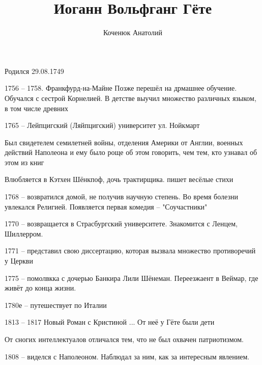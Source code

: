 \documentclass[10pt,a4paper]{article}
\author{Коченюк Анатолий}
\title{Иоганн Вольфганг Гёте}
\begin{document}
\maketitle

Родился 29.08.1749

1756 -- 1758. Франкфурд-на-Майне
Позже перешёл на дрмашнее обучение. Обучался с сестрой Корнелией. В детстве выучил множество различных языком, в том числе древних

1765 -- Лейпцигский (Ляйпцигский) университет ул. Нойкмарт

Был свидетелем семилетней войны, отделения Америки от Англии, военных действий Наполеона и ему было роще об этом говорить, чем тем, кто узнавал об этом из книг

Влюбляется в Кэтхен Шёнкпоф, дочь трактирщика. пишет весёлые стихи

1768 -- возвратился домой, не получив научную степень. Во время болезни увлекался Религией. Появляется первая комедия -- "Соучастники"

1770 -- возвращается в Страсбургский университете. Знакомится с Ленцем, Шиллерром.

1771 -- представил свою диссертацию, которая вызвала множество противоречий у Церкви

1775 -- помолвкка с дочерью Банкира Лили Шёнеман. Переезжаент в Веймар, где живёт до конца жизни.

1780е -- путешествует по Италии

1813 -- 1817 Новый Роман с Кристиной ... От неё у Гёте были дети

От сногих интеллектуалов отличался тем, что не был охвачен патриотизмом.

1808 -- виделся с Наполеоном. Наблюдал за ним, как за интересным явлением.
\end{document}
